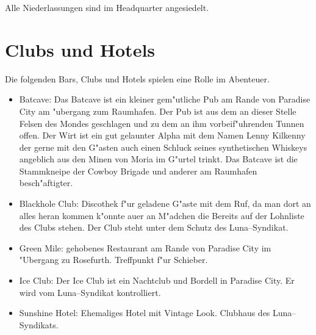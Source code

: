 Alle Niederlassungen sind im Headquarter angesiedelt.

\section{Clubs und Hotels}

Die folgenden Bars, Clubs und Hotels spielen eine Rolle im Abenteuer.

\begin{itemize}
    \item Batcave: Das Batcave ist ein kleiner gem"utliche Pub am Rande von Paradise City am "ubergang zum Raumhafen. Der Pub ist aus dem an dieser Stelle Felsen des Mondes geschlagen und zu dem an ihm vorbeif"uhrenden Tunnen offen. Der Wirt ist ein gut gelaunter Alpha mit dem Namen Lenny Kilkenny der gerne mit den G"asten auch einen Schluck seines synthetischen Whiskeys angeblich aus den Minen von Moria im G"urtel trinkt. Das Batcave ist die Stammkneipe der Cowboy Brigade und anderer am Raumhafen besch"aftigter.
    \item Blackhole Club: Discothek f"ur geladene G"aste mit dem Ruf, da\3 man dort an alles heran kommen k"onnte au\3er an M"adchen die Bereits auf der Lohnliste des Clubs stehen. Der Club steht unter dem Schutz des Luna--Syndikat.
    \item Green Mile: gehobenes Restaurant am Rande von Paradise City im "Ubergang zu Rosefurth.  Treffpunkt f"ur Schieber.
    \item Ice Club: Der Ice Club ist ein Nachtclub und Bordell in Paradise City. Er wird vom Luna--Syndikat kontrolliert.
    \item Sunshine Hotel: Ehemaliges Hotel mit Vintage Look. Clubhaus des Luna--Syndikats.
    
\end{itemize}

